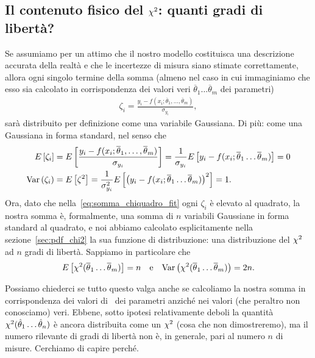 \subsection{Il contenuto fisico del \texorpdfstring{$\chi^2$}{chi2}:
  quanti gradi di libertà?}

Se assumiamo per un attimo che il nostro modello costituisca una descrizione
accurata della realtà e che le incertezze di misura siano stimate
correttamente, allora ogni singolo termine della somma (almeno nel caso in cui
immaginiamo che esso sia calcolato in corrispondenza dei valori veri
$\overline{\theta}_1 \ldots \overline{\theta}_m$ dei parametri)
\begin{align*}
  \zeta_i = \frac{y_i -
    f(x_i; \overline{\theta}_1,\ldots,\overline{\theta}_m)}{\sigma_{y_i}},
\end{align*}
sarà distribuito per definizione come una variabile Gaussiana. Di più: come
una Gaussiana in forma standard, nel senso che
\begin{align*}
  \displaystyle E\left[\zeta_i\right] &= \displaystyle E\left[\frac{y_i -
      f(x_i; \overline{\theta}_1,\ldots,\overline{\theta}_m)}{\sigma_{y_i}}\right] =
  \frac{1}{\sigma_{y_i}}\displaystyle E\left[y_i -
    f(x_i; \overline{\theta}_1 \ldots \overline{\theta}_m)\right] = 0\\
  \text{Var}\left(\zeta_i\right) &= \displaystyle E\left[\zeta^2\right] = \frac{1}{\sigma^2_{y_i}}\displaystyle E\left[\left(y_i -
    f(x_i; \overline{\theta}_1 \ldots \overline{\theta}_m)\right)^2\right] = 1.
\end{align*}
Ora, dato che nella~\eqref{eq:somma_chiquadro_fit} ogni $\zeta_i$ è elevato
al quadrato, la nostra somma è, formalmente, una somma di $n$ variabili
Gaussiane in forma standard al quadrato, e noi abbiamo calcolato esplicitamente
nella sezione~\ref{sec:pdf_chi2} la sua funzione di distribuzione: una
distribuzione del $\chi^2$ ad $n$ gradi di libertà. Sappiamo in particolare
che
\begin{align}
  \displaystyle E\left[\chi^2(\overline{\theta}_1 \ldots \overline{\theta}_m)\right] = n
  \quad \text{e} \quad
  \text{Var}\left(\chi^2(\overline{\theta}_1 \ldots \overline{\theta}_m)\right) = 2n.
\end{align}

Possiamo chiederci se tutto questo valga anche se calcoliamo la nostra somma
in corrispondenza dei valori di \bestfit\ dei parametri anziché nei
valori (che peraltro non conosciamo) veri. Ebbene, sotto ipotesi relativamente
deboli la quantità $\chi^2(\hat{\theta}_1 \ldots \hat{\theta}_n)$ è
ancora distribuita come un $\chi^2$ (cosa che non dimostreremo), ma il numero
rilevante di gradi di libertà non è, in generale, pari al numero $n$ di
misure. Cerchiamo di capire perché.

